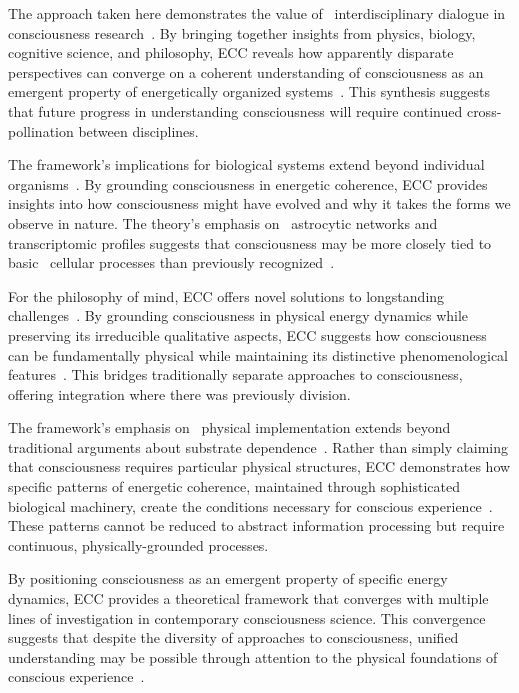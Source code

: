 The approach taken here demonstrates the value of~ interdisciplinary dialogue in consciousness research~\cite{deacon2013incomplete}. By bringing together insights from physics, biology, cognitive science, and philosophy, ECC reveals how apparently disparate perspectives can converge on a coherent understanding of consciousness as an~ emergent property of energetically organized systems~\cite{koch2019feeling, thompson2010mind}. This synthesis suggests that future progress in understanding consciousness will require continued cross-pollination between disciplines.

The framework's implications for biological systems extend beyond individual organisms~\cite{rosen2012anticipatory, gibson2015ecological}. By grounding consciousness in energetic coherence, ECC provides insights into how consciousness might have evolved and why it takes the forms we observe in nature. The theory's emphasis on~ astrocytic networks and~ transcriptomic profiles suggests that consciousness may be more closely tied to basic~ cellular processes than previously recognized~\cite{thompson2014waking, bosl2025dynamical}.

For the philosophy of mind, ECC offers novel solutions to longstanding challenges~\cite{pigliucci2013philosophy}. By grounding consciousness in physical energy dynamics while preserving its irreducible qualitative aspects, ECC suggests how consciousness can be fundamentally physical while maintaining its distinctive phenomenological features~\cite{block2009comparing, kauffman2019world}. This bridges traditionally separate approaches to consciousness, offering integration where there was previously division.

The framework's emphasis on~ physical implementation extends beyond traditional arguments about substrate dependence~\cite{noe2009out, gibson2015ecological}. Rather than simply claiming that consciousness requires particular physical structures, ECC demonstrates how specific patterns of energetic coherence, maintained through sophisticated biological machinery, create the conditions necessary for conscious experience~\cite{koch2019feeling}. These patterns cannot be reduced to abstract information processing but require continuous, physically-grounded processes.

By positioning consciousness as an emergent property of specific energy dynamics, ECC provides a theoretical framework that converges with multiple lines of investigation in contemporary consciousness science. This convergence suggests that despite the diversity of approaches to consciousness, unified understanding may be possible through attention to the physical foundations of conscious experience~\cite{seth2021being, thompson2014waking}.

